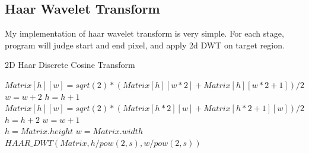 \documentclass[UTF8, letterpaper, 14pt]{article}
\begin{document}
\subsection{Haar Wavelet Transform}
My implementation of haar wavelet transform is very simple. For each stage, program will judge start and end pixel, and apply 2d DWT on target region.
\begin{spacing}{0.7}
\begin{algorithm}[htb]
\caption{2D Haar Discrete Cosine Transform}
   \begin{algorithmic}[1]
        			\State $Matrix[h][w] = sqrt(2) * (Matrix[h][w*2] + Matrix[h][w*2+1]) / 2$
        			\State $w = w + 2$
        		\EndFor
        		\State $h = h + 1$
        \EndFor
        			\State $Matrix[h][w] = sqrt(2) * (Matrix[h*2][w] + Matrix[h*2+1][w]) / 2$
        			\State $h = h + 2$
        		\EndFor
        		\State $w = w + 1$
        \EndFor
       \EndFunction
       \\
      	\State $ h = Matrix.height$
      	\State $ w = Matrix.width$
        		\State $HAAR\_DWT( Matrix, h /pow(2,s), w/pow(2,s))$
        	\EndFor
      \EndFunction
\end{algorithmic}
\end{algorithm}
\end{spacing}
\end{document}
